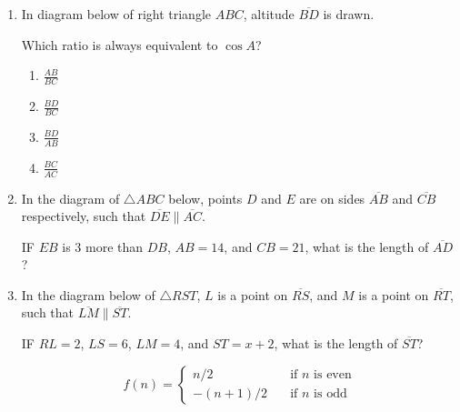 \documentclass[12pt, oneside]{article}
\begin{document}
\begin{enumerate}[itemsep=1.7cm]
\item In diagram below of right triangle $ABC$, altitude $\overline{BD}$ is drawn.
  \begin{center}
  \end{center}
Which ratio is always equivalent to $\cos A$?
\begin{multicols}{2}
  \begin{enumerate}
    \item $\displaystyle \frac{AB}{BC}$
    \item $\displaystyle \frac{BD}{BC}$ 
    \item $\displaystyle \frac{BD}{AB}$
    \item $\displaystyle \frac{BC}{AC}$
  \end{enumerate}
\end{multicols}

\item In the diagram of $\triangle ABC$ below, points $D$ and $E$ are on sides $\overline{AB}$ and $\overline{CB}$ respectively, such that $\overline{DE} \parallel \overline{AC}$.
\begin{center}
\end{center}
IF $EB$ is 3 more than $DB$, $AB=14$, and $CB=21$, what is the length of $\overline{AD}$?

\newpage
\item In the diagram below of $\triangle RST$, $L$ is a point on $\overline{RS}$, and $M$ is a point on $\overline{RT}$, such that $\overline{LM} \parallel \overline{ST}$.
\begin{center}
\end{center}
IF $RL=2$, $LS=6$, $LM=4$, and $ST=x+2$, what is the length of $\overline{ST}$?

\newpage
\[ f(n) =
  \begin{cases}
    n/2       & \quad \text{if } n \text{ is even}\\
    -(n+1)/2  & \quad \text{if } n \text{ is odd}
  \end{cases}
\]

\end{enumerate}
\end{document}
